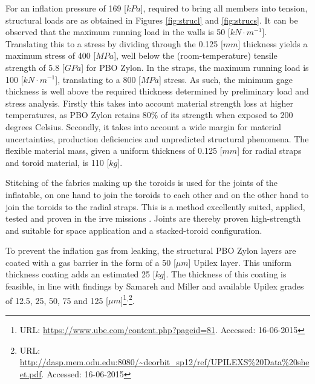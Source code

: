 For an inflation pressure of 169 [$kPa$], required to bring all members into tension, structural loads are as obtained in Figures \ref{fig:strucl} and \ref{fig:strucs}. It can be observed that the maximum running load in the walls is 50 [$kN \cdot m^{-1}$]. Translating this to a stress by dividing through the 0.125 [$mm$] thickness yields a maximum stress of 400 [$MPa$], well below the (room-temperature) tensile strength of 5.8 [$GPa$] for PBO Zylon. In the straps, the maximum running load is 100 [$kN \cdot m^{-1}$], translating to a 800 [$MPa$] stress. As such, the minimum gage thickness is well above the required thickness determined by preliminary load and stress analysis. Firstly this takes into account material strength loss at higher temperatures, as PBO Zylon retains $80\%$ of its strength when exposed to 200 degrees Celsius. Secondly, it takes into account a wide margin for material uncertainties, production deficiencies and unpredicted structural phenomena. The flexible material mass, given a uniform thickness of 0.125 [$mm$] for radial straps and toroid material, is 110 [$kg$].

Stitching of the fabrics making up the toroids is used for the joints of the inflatable, on one hand to join the toroids to each other and on the other hand to join the toroids to the radial straps. This is a method excellently suited, applied, tested and proven in the \gls{irve} missions \cite{Lindell2006,Hughes2011,Dillman2012}. Joints are thereby proven high-strength and suitable for space application and a stacked-toroid configuration.

To prevent the inflation gas from leaking, the structural PBO Zylon layers are coated with a gas barrier in the form of a 50 [$\mu m$] Upilex layer. This uniform thickness coating adds an estimated 25 [$kg$]. The thickness of this coating is feasible, in line with findings by Samareh and Miller \cite{Samareh2011,Miller2014} and available Upilex grades of 12.5, 25, 50, 75 and 125 [$\mu m$]\footnote{URL: \url{https://www.ube.com/content.php?pageid=81}. Accessed: 16-06-2015}$^{,}$\footnote{URL: \url{http://dasp.mem.odu.edu:8080/~deorbit_sp12/ref/UPILEXS\%20Data\%20sheet.pdf}. Accessed: 16-06-2015}.


